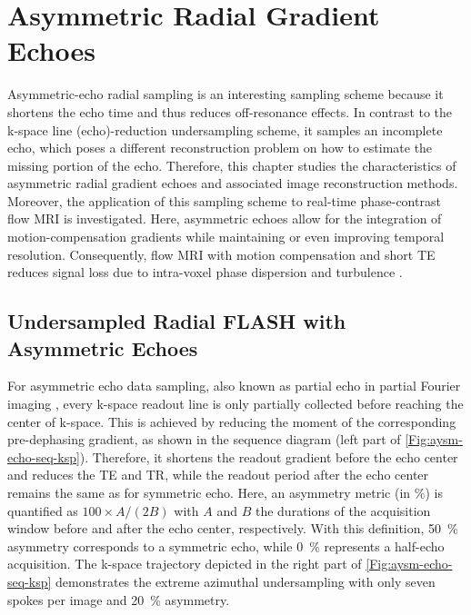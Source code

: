 \chapter{Asymmetric Radial Gradient Echoes}
 \label{Chp:asym-echo}

Asymmetric-echo radial sampling is an interesting sampling scheme because it shortens the echo time and thus reduces off-resonance effects. In contrast to the k-space line (echo)-reduction undersampling scheme, it samples an incomplete echo, which poses a different reconstruction problem on how to estimate the missing portion of the echo. Therefore, this chapter studies the characteristics of asymmetric radial gradient echoes and associated image reconstruction methods. Moreover, the application of this sampling scheme to real-time phase-contrast flow MRI is investigated. Here, asymmetric echoes allow for the integration of motion-compensation gradients while maintaining or even improving temporal resolution. Consequently, flow MRI with motion compensation and short \acs{TE} reduces signal loss due to intra-voxel phase dispersion and turbulence \cite{2015_PC_rev}.

\section{Undersampled Radial FLASH with Asymmetric Echoes}
For asymmetric echo data sampling, also known as partial echo in partial Fourier imaging \cite{2004_MRI_Bernstein}, every k-space readout line is only partially collected before reaching the center of k-space. This is achieved by reducing the moment of the corresponding pre-dephasing gradient, as shown in the sequence diagram (left part of \cref{Fig:aysm-echo-seq-ksp}). Therefore, it shortens the readout gradient before the echo center and reduces the TE and TR, while the readout period after the echo center remains the same as for symmetric echo. Here, an asymmetry metric (in $\%$) is quantified as $100 \times A / (2 B)$ with $A$ and $B$ the durations of the acquisition window before and after the echo center, respectively. With this definition, \SI{50}{\percent} asymmetry corresponds to a symmetric echo, while \SI{0}{\percent} represents a half-echo acquisition. The k-space trajectory depicted in the right part of \cref{Fig:aysm-echo-seq-ksp} demonstrates the extreme azimuthal undersampling with only seven spokes per image and \SI{20}{\percent} asymmetry.

